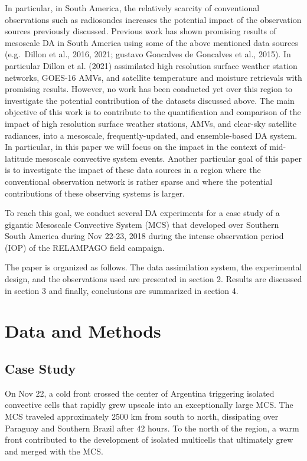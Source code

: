\documentclass[final,5p,times,twocolumn,authoryear]{elsarticle} %
\begin{document}
In particular, in South America, the relatively scarcity of conventional observations such as radiosondes increases the potential impact of the observation sources previously discussed. Previous work has shown promising results of mesoscale DA in South America using some of the above mentioned data sources (e.g.~Dillon et al., 2016, 2021; gustavo Goncalves de Goncalves et al., 2015). In particular Dillon et al. (2021) assimilated high resolution surface weather station networks, GOES-16 AMVs, and satellite temperature and moisture retrievals with promising results. However, no work has been conducted yet over this region to investigate the potential contribution of the datasets discussed above.
The main objective of this work is to contribute to the quantification and comparison of the impact of high resolution surface weather stations, AMVs, and clear-sky satellite radiances, into a mesoscale, frequently-updated, and ensemble-based DA system. In particular, in this paper we will focus on the impact in the context of mid-latitude mesoscale convective system events. Another particular goal of this paper is to investigate the impact of these data sources in a region where the conventional observation network is rather sparse and where the potential contributions of these observing systems is larger.

To reach this goal, we conduct several DA experiments for a case study of a gigantic Mesoscale Convective System (MCS) that developed over Southern South America during Nov 22-23, 2018 during the intense observation period (IOP) of the RELAMPAGO field campaign.

The paper is organized as follows. The data assimilation system, the experimental design, and the observations used are presented in section 2. Results are discussed in section 3 and finally, conclusions are summarized in section 4.

\hypertarget{data-and-methods}{%
\section{Data and Methods}\label{data-and-methods}}

\hypertarget{case-study}{%
\subsection{Case Study}\label{case-study}}

On Nov 22, a cold front crossed the center of Argentina triggering isolated convective cells that rapidly grew upscale into an exceptionally large MCS.
The MCS traveled approximately 2500 km from south to north, dissipating over Paraguay and Southern Brazil after 42 hours.
To the north of the region, a warm front contributed to the development of isolated multicells that ultimately grew and merged with the MCS.
\end{document}
